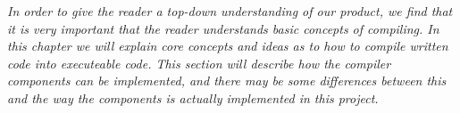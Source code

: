 \textit{In order to give the reader a top-down understanding of our product, we find that it is very important that the reader understands basic concepts of compiling. In this chapter we will explain core concepts and ideas as to how to compile written code into executeable code. This section will describe how the compiler components can be implemented, and there may be some differences between this and the way the components is actually implemented in this project.}